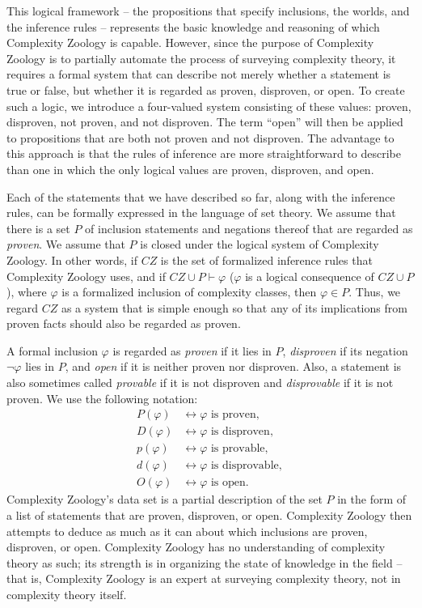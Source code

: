 This logical framework -- the propositions that specify inclusions, the worlds,
and the inference rules -- represents the basic knowledge and reasoning of which
Complexity Zoology is capable. However, since the purpose of Complexity Zoology
is to partially automate the process of surveying complexity theory, it requires
a formal system that can describe not merely whether a statement is true or
false, but whether it is regarded as proven, disproven, or open. To create such a 
logic, we introduce a four-valued system consisting of these values: proven, 
disproven, not proven, and not disproven. The term ``open'' will then be applied to 
propositions that are both not proven and not disproven. The advantage to this 
approach is that the rules of inference are more straightforward to describe than 
one in which the only logical values are proven, disproven, and open.

Each of the statements that we have described so far, along with the inference
rules, can be formally expressed in the language of set theory. We assume that
there is a set $P$ of inclusion statements and negations thereof that are
regarded as \textit{proven}. We assume that $P$ is closed under the logical
system of Complexity Zoology. In other words, if $CZ$ is the set of formalized
inference rules that Complexity Zoology uses, and if $CZ\cup P\vdash\varphi$
($\varphi$ is a logical consequence of $CZ\cup P$), where $\varphi$ is a
formalized inclusion of complexity classes, then $\varphi\in P$. Thus, we regard
$CZ$ as a system that is simple enough so that any of its implications from
proven facts should also be regarded as proven.

A formal inclusion $\varphi$ is regarded as \textit{proven} if it lies in $P$,
\textit{disproven} if its negation $\neg\varphi$ lies in $P$, and \textit{open}
if it is neither proven nor disproven. Also, a statement is also sometimes 
called \textit{provable} if it is not disproven and \textit{disprovable} if it 
is not proven. We use the following notation:
\begin{align*}
P(\varphi) &\longleftrightarrow\varphi\text{ is proven}, \\
D(\varphi) &\longleftrightarrow\varphi\text{ is disproven}, \\
p(\varphi) &\longleftrightarrow\varphi\text{ is provable}, \\
d(\varphi) &\longleftrightarrow\varphi\text{ is disprovable}, \\
O(\varphi) &\longleftrightarrow\varphi\text{ is open}.
\end{align*}
Complexity Zoology's data set is a partial description of the set $P$ in the form of a list of
statements that are proven, disproven, or open. Complexity Zoology then attempts
to deduce as much as it can about which inclusions are proven, disproven, or
open. Complexity Zoology has no understanding of complexity theory as such; its
strength is in organizing the state of knowledge in the field -- that is,
Complexity Zoology is an expert at surveying complexity theory, not in
complexity theory itself.


